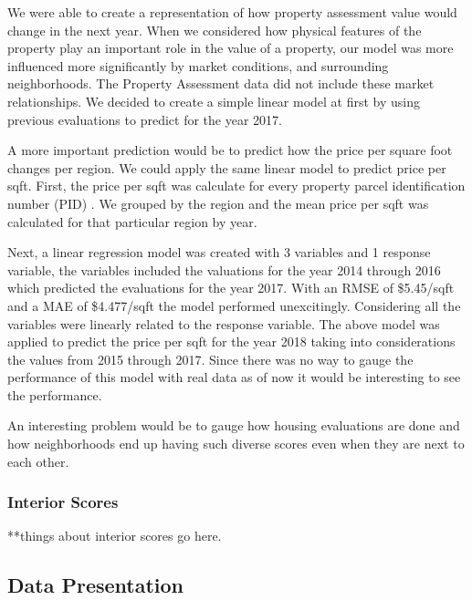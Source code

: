 \documentclass[12pt]{article}
\begin{document}
We were able to create a representation of how property assessment
value would change in the next year. When we considered how physical
features of the property play an important role in the value of a
property, our model was more influenced more significantly by market
conditions, and surrounding neighborhoods. The Property Assessment data
did not include these market relationships. We decided to create a
simple linear model at first by using previous evaluations to predict for
the year 2017.

A more important prediction would be to predict how the price per square 
foot changes per region. We could apply the same linear model to predict 
price per sqft. First, the price per sqft was calculate for every
property parcel identification number (PID) \cite{Property49:online}. We
grouped by the region and the mean price per sqft was calculated for that
particular region by year.

Next, a linear regression model was created with 3 variables and 1 
response variable, the variables included the valuations for the year 
2014 through 2016 which predicted the evaluations for the year 2017. With 
an RMSE of \$5.45/sqft and a MAE of \$4.477/sqft the model performed 
unexcitingly. Considering all the variables were linearly related to the 
response variable. The above model was applied to predict the price per
sqft for the year 2018 taking into considerations the values from 2015
through 2017. Since there was no way to gauge the performance of this
model with real data as of now it would be interesting to see the
performance.

An interesting problem would be to gauge how housing evaluations are done 
and how neighborhoods end up having such diverse scores even when they
are next to each other.

\subsubsection{Interior Scores}

**things about interior scores go here.

\subsection{Data Presentation}
\end{document}
